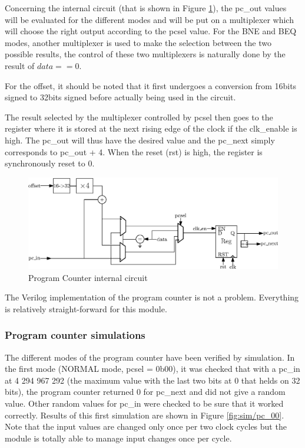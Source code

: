 Concerning the internal circuit (that is shown in Figure \ref{fig:components/pc_in}), the pc\_out 
values will be evaluated for the different modes and 
will be put on a multiplexer which will choose the right output according to the pcsel value. For the BNE 
and BEQ modes, another multiplexer is used to make the selection between the two possible results, 
the control of these two multiplexers is naturally done by the result of $data == 0$. 

For the offset, it should be noted that it first undergoes a conversion from 16bits signed to 32bits 
signed before actually being used in the circuit.

The result selected by the multiplexer controlled by pcsel then goes to the register where it is 
stored at the next rising edge of the clock if the clk\_enable is high. The 
pc\_out will thus have the desired value and the pc\_next simply corresponds to pc\_out + 4. When 
the reset (rst) is high, the register is synchronously reset to 0.

\begin{figure}[H]
    \centering
    \includegraphics[width=\linewidth]{Chapter3-CPU/res/pc_internal}
    \caption{Program Counter internal circuit}
    \label{fig:components/pc_in}
\end{figure}

The Verilog implementation of the program counter is not a problem. Everything is relatively 
straight-forward for this module.

\subsubsection*{Program counter simulations}

The different modes of the program counter have been verified by simulation. In the first mode 
(NORMAL mode, pcsel = 0b00), it was checked that with a pc\_in at 4 294 967 292 (the maximum value with 
the last two bits at 0 that helds on 32 bits), the program counter returned 0 for pc\_next and did not 
give a random value. Other random values for pc\_in were checked to be sure that it worked 
correctly. Results of this first simulation are shown in Figure \ref{fig:sim/pc_00}. Note that the
input values are changed only once per two clock cycles but the module is totally able to manage
input changes once per cycle.

